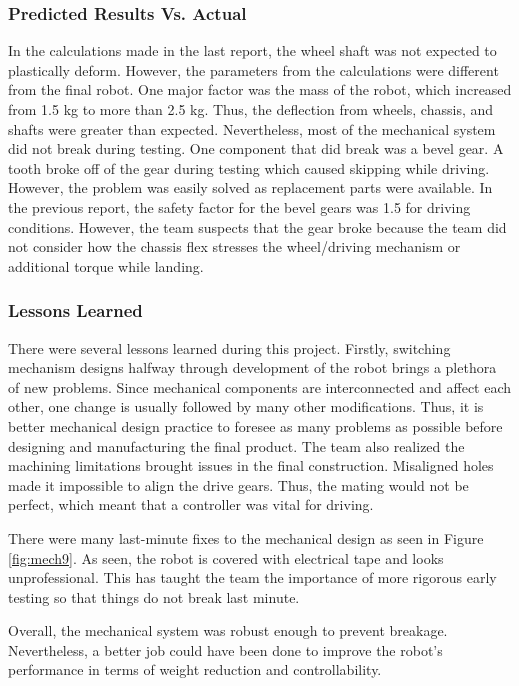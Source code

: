 \documentclass[ece]{uw-wkrpt}
\begin{document}
\subsubsection{Predicted Results Vs. Actual}

In the calculations made in the last report, the wheel shaft was not expected to plastically deform. However, the parameters from the calculations were different from the final robot. One major factor was the mass of the robot, which increased from 1.5 kg to more than 2.5 kg. Thus, the deflection from wheels, chassis, and shafts were greater than expected. Nevertheless, most of the mechanical system did not break during testing. One component that did break was a bevel gear. A tooth broke off of the gear during testing which caused skipping while driving. However, the problem was easily solved as replacement parts were available. In the previous report, the safety factor for the bevel gears was 1.5 for driving conditions. However, the team suspects that the gear broke because the team did not consider how the chassis flex stresses the wheel/driving mechanism or additional torque while landing.

\subsubsection{Lessons Learned}

There were several lessons learned during this project. Firstly, switching mechanism designs halfway through development of the robot brings a plethora of new problems. Since mechanical components are interconnected and affect each other, one change is usually followed by many other modifications. Thus, it is better mechanical design practice to foresee as many problems as possible before designing and manufacturing the final product. The team also realized the machining limitations brought issues in the final construction. Misaligned holes made it impossible to align the drive gears. Thus, the mating would not be perfect, which meant that a controller was vital for driving. 

There were many last-minute fixes to the mechanical design as seen in Figure \ref{fig:mech9}. As seen, the robot is covered with electrical tape and looks unprofessional. This has taught the team the importance of more rigorous early testing so that things do not break last minute. 

Overall, the mechanical system was robust enough to prevent breakage. Nevertheless, a better job could have been done to improve the robot’s performance in terms of weight reduction and controllability. 
\end{document}
